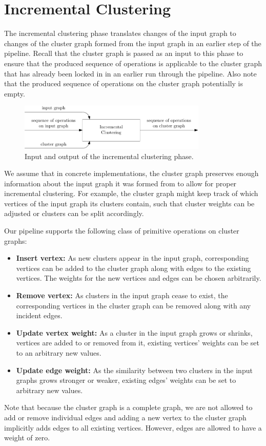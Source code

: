 \section{Incremental Clustering}
\label{sect:incremental-clustering}

The incremental clustering phase translates changes of the input graph to changes of the cluster graph formed from the input graph in an earlier step of the pipeline. Recall that the cluster graph is passed as an input to this phase to ensure that the produced sequence of operations is applicable to the cluster graph that has already been locked in in an earlier run through the pipeline. Also note that the produced sequence of operations on the cluster graph potentially is empty.

\begin{figure}[H]
	\centering\includegraphics[width=0.8\textwidth]{Resources/DynamicPipeline-IncrementalClustering.pdf}
	\caption{Input and output of the incremental clustering phase.}
	\label{fig:dynamic-pipeline-incremental-transformation}
\end{figure}

We assume that in concrete implementations, the cluster graph preserves enough information about the input graph it was formed from to allow for proper incremental clustering. For example, the cluster graph might keep track of which vertices of the input graph its clusters contain, such that cluster weights can be adjusted or clusters can be split accordingly.

Our pipeline supports the following class of primitive operations on cluster graphs:
%
\begin{itemize}
	\item \textbf{Insert vertex:} As new clusters appear in the input graph, corresponding vertices can be added to the cluster graph along with edges to the existing vertices. The weights for the new vertices and edges can be chosen arbitrarily.
	\item \textbf{Remove vertex:} As clusters in the input graph cease to exist, the corresponding vertices in the cluster graph can be removed along with any incident edges.
	\item \textbf{Update vertex weight:} As a cluster in the input graph grows or shrinks, \ie{} vertices are added to or removed from it, existing vertices' weights can be set to an arbitrary new values.
	\item \textbf{Update edge weight:} As the similarity between two clusters in the input graphs grows stronger or weaker, existing edges' weights can be set to arbitrary new values.
\end{itemize}
%
Note that because the cluster graph is a complete graph, we are not allowed to add or remove individual edges and adding a new vertex to the cluster graph implicitly adds edges to all existing vertices. However, edges are allowed to have a weight of zero.

